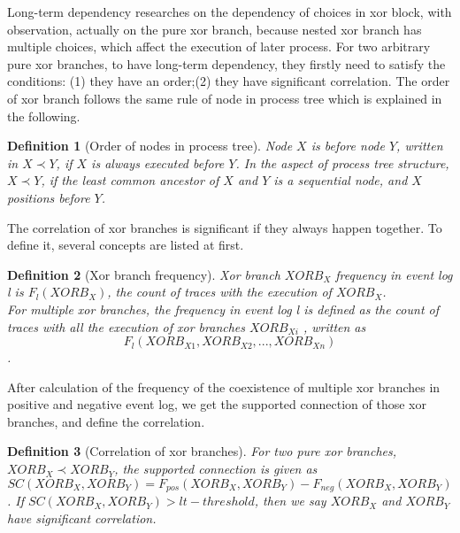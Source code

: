 \documentclass[]{article}
\newtheorem{mydef}{Definition}[section]
\begin{document}

Long-term dependency researches on the dependency of choices in xor block, with observation, actually on the pure xor branch, because nested xor branch has multiple choices, which affect the execution of later process. For two arbitrary pure xor branches, to have long-term dependency, they firstly need to satisfy the conditions: (1) they have an order;(2) they have significant correlation.
The order of xor branch follows the same rule of node in process tree which is explained in the following.
\begin{mydef}[Order of nodes in process tree]
	Node $X$ is before node $Y$, written in $X \prec Y$, if $X$ is always executed before $Y$.  In the aspect of process tree structure, $X \prec Y$, if the least common ancestor of $X$ and $Y$ is a sequential node, and $X$ positions before $Y$.
\end{mydef} 
The correlation of xor branches is significant if they always happen together. To define it, several concepts are listed at first. 
\begin{mydef}[Xor branch frequency]
	Xor branch $XORB_X$ frequency in event log l is $F_{l}(XORB_X)$, the count of traces with the execution of $XORB_X$. \\
	For multiple xor branches, the frequency in event log l is defined as the count of traces with all the execution of xor branches $XORB_{Xi}$ , written as \[F_{l}(XORB_{X1}, XORB_{X2},...,XORB_{Xn})\].
\end{mydef}
After calculation of the frequency of the coexistence of multiple xor branches in positive and negative event log, we get the supported connection of those xor branches, and define the correlation. 
\begin{mydef}[Correlation of xor branches]
	\label{def: supported-connection}
	For two pure xor branches, $XORB_X \prec XORB_Y$, the supported connection is given as \[SC(XORB_X,XORB_Y)= F_{pos}(XORB_X, XORB_Y) -F_{neg}(XORB_X, XORB_Y)\]. If $SC(XORB_X,XORB_Y) > lt-threshold$, then we say $XORB_X$ and $XORB_Y$ have significant correlation.
\end{mydef}
\end{document}
